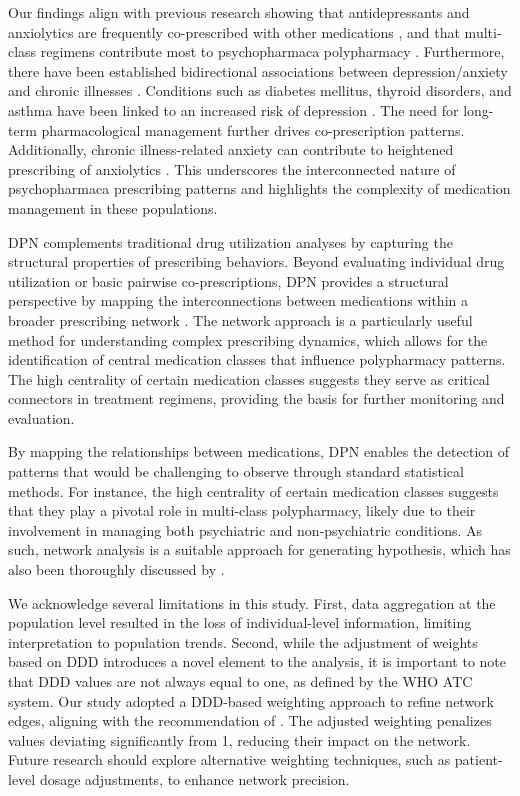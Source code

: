 \documentclass[
  authoryear,
  review]{elsarticle}
\begin{document}
Our findings align with previous research showing that antidepressants
and anxiolytics are frequently co-prescribed with other medications
\citep{Shrivastava2013}, and that multi-class regimens contribute most
to psychopharmaca polypharmacy \citep{de2004polypharmacy}. Furthermore,
there have been established bidirectional associations between
depression/anxiety and chronic illnesses \citep{qi2024longitudinal}.
Conditions such as diabetes mellitus, thyroid disorders, and asthma have
been linked to an increased risk of depression \citep{jang2024temporal}.
The need for long-term pharmacological management further drives
co-prescription patterns. Additionally, chronic illness-related anxiety
can contribute to heightened prescribing of anxiolytics
\citep{lebel2020health}. This underscores the interconnected nature of
psychopharmaca prescribing patterns and highlights the complexity of
medication management in these populations.

DPN complements traditional drug utilization analyses by capturing the
structural properties of prescribing behaviors. Beyond evaluating
individual drug utilization or basic pairwise co-prescriptions, DPN
provides a structural perspective by mapping the interconnections
between medications within a broader prescribing network
\citep{Bazzoni2015}. The network approach is a particularly useful
method for understanding complex prescribing dynamics, which allows for
the identification of central medication classes that influence
polypharmacy patterns. The high centrality of certain medication classes
suggests they serve as critical connectors in treatment regimens,
providing the basis for further monitoring and evaluation.

By mapping the relationships between medications, DPN enables the
detection of patterns that would be challenging to observe through
standard statistical methods. For instance, the high centrality of
certain medication classes suggests that they play a pivotal role in
multi-class polypharmacy, likely due to their involvement in managing
both psychiatric and non-psychiatric conditions. As such, network
analysis is a suitable approach for generating hypothesis, which has
also been thoroughly discussed by \citet{Askar2021}.

We acknowledge several limitations in this study. First, data
aggregation at the population level resulted in the loss of
individual-level information, limiting interpretation to population
trends. Second, while the adjustment of weights based on DDD introduces
a novel element to the analysis, it is important to note that DDD values
are not always equal to one, as defined by the WHO ATC system. Our study
adopted a DDD-based weighting approach to refine network edges, aligning
with the recommendation of \citet{Cavallo2012}. The adjusted weighting
penalizes values deviating significantly from 1, reducing their impact
on the network. Future research should explore alternative weighting
techniques, such as patient-level dosage adjustments, to enhance network
precision.
\end{document}
